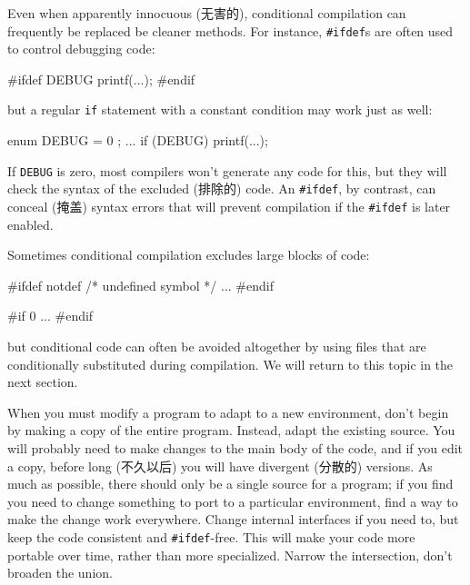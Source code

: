 Even when apparently innocuous (无害的), conditional compilation can
frequently be replaced be cleaner methods. For instance, \verb'#ifdef's are
often used to control debugging code:
\begin{badcode}
    #ifdef DEBUG
        printf(...);
    #endif
\end{badcode}
but a regular \verb'if' statement with a constant condition may work just
as well:
\begin{wellcode}
    enum { DEBUG = 0 };
    ...
    if (DEBUG) {
        printf(...);
    }
\end{wellcode}
If \verb'DEBUG' is zero, most compilers won't generate any code for this,
but they will check the syntax of the excluded (排除的) code. An
\verb'#ifdef', by contrast, can conceal (掩盖) syntax errors that will
prevent compilation if the \verb'#ifdef' is later enabled.

Sometimes conditional compilation excludes large blocks of code:
\begin{wellcode}
    #ifdef notdef   /* undefined symbol */
        ...
    #endif

    #if 0
        ...
    #endif
\end{wellcode}
but conditional code can often be avoided altogether by using files that
are conditionally substituted during compilation. We will return to this
topic in the next section.

When you must modify a program to adapt to a new environment, don't begin
by making a copy of the entire program. Instead, adapt the existing source.
You will probably need to make changes to the main body of the code, and if
you edit a copy, before long (不久以后) you will have divergent (分散的)
versions. As much as possible, there should only be a single source for a
program; if you find you need to change something to port to a particular
environment, find a way to make the change work everywhere.  Change
internal interfaces if you need to, but keep the code consistent and
\verb'#ifdef'-free. This will make your code more portable over time,
rather than more specialized.  Narrow the intersection, don't broaden the
union.

